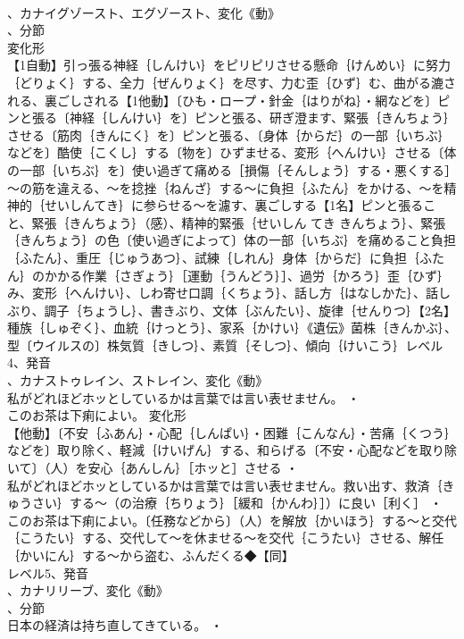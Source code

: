 \documentclass[8pt]{extreport}
\begin{document}
\begin{CJK}{UTF8}{min}
\\	、カナイグゾースト、エグゾースト、変化《動》
\\	、分節
\\	変化形 
\\	【1自動】引っ張る神経｛しんけい｝をピリピリさせる懸命｛けんめい｝に努力｛どりょく｝する、全力｛ぜんりょく｝を尽す、力む歪｛ひず｝む、曲がる漉される、裏ごしされる【1他動】〔ひも・ロープ・針金｛はりがね｝・網などを〕ピンと張る〔神経｛しんけい｝を〕ピンと張る、研ぎ澄ます、緊張｛きんちょう｝させる〔筋肉｛きんにく｝を〕ピンと張る、〔身体｛からだ｝の一部｛いちぶ｝などを〕酷使｛こくし｝する〔物を〕ひずませる、変形｛へんけい｝させる〔体の一部｛いちぶ｝を〕使い過ぎて痛める［損傷｛そんしょう｝する・悪くする］～の筋を違える、～を捻挫｛ねんざ｝する～に負担｛ふたん｝をかける、～を精神的｛せいしんてき｝に参らせる～を濾す、裏ごしする【1名】ピンと張ること、緊張｛きんちょう｝（感）、精神的緊張｛せいしん てき きんちょう｝、緊張｛きんちょう｝の色〔使い過ぎによって〕体の一部｛いちぶ｝を痛めること負担｛ふたん｝、重圧｛じゅうあつ｝、試練｛しれん｝身体｛からだ｝に負担｛ふたん｝のかかる作業｛さぎょう｝［運動｛うんどう｝］、過労｛かろう｝歪｛ひず｝み、変形｛へんけい｝、しわ寄せ口調｛くちょう｝、話し方｛はなしかた｝、話しぶり、調子｛ちょうし｝、書きぶり、文体｛ぶんたい｝、旋律｛せんりつ｝【2名】種族｛しゅぞく｝、血統｛けっとう｝、家系｛かけい｝《遺伝》菌株｛きんかぶ｝、型〔ウイルスの〕株気質｛きしつ｝、素質｛そしつ｝、傾向｛けいこう｝レベル4、発音
\\	、カナストゥレイン、ストレイン、変化《動》
\\	私がどれほどホッとしているかは言葉では言い表せません。 ・
\\	このお茶は下痢によい。	変化形 
\\	【他動】〔不安｛ふあん｝・心配｛しんぱい｝・困難｛こんなん｝・苦痛｛くつう｝などを〕取り除く、軽減｛けいげん｝する、和らげる〔不安・心配などを取り除いて〕（人）を安心｛あんしん｝［ホッと］させる ・
\\	私がどれほどホッとしているかは言葉では言い表せません。救い出す、救済｛きゅうさい｝する～（の治療｛ちりょう｝［緩和｛かんわ｝］）に良い［利く］ ・
\\	このお茶は下痢によい。〔任務などから〕（人）を解放｛かいほう｝する～と交代｛こうたい｝する、交代して～を休ませる～を交代｛こうたい｝させる、解任｛かいにん｝する～から盗む、ふんだくる◆【同】
\\	レベル5、発音
\\	、カナリリーブ、変化《動》
\\	、分節
\\	日本の経済は持ち直してきている。 ・

\end{CJK}
\end{document}
